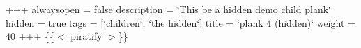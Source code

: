 +++ alwaysopen = false description = \char`\"{}\+This be a hidden demo child plank\char`\"{} hidden = true tags = \mbox{[}\char`\"{}children\char`\"{}, \char`\"{}the hidden\char`\"{}\mbox{]} title = \char`\"{}plank 4 (hidden)\char`\"{} weight = 40 +++ \{\{$<$ piratify $>$\}\} 
